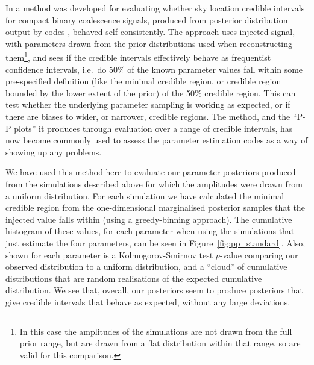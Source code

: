 In \citet{2014PhRvD..89h4060S} a method was developed for evaluating whether sky location credible intervals for compact binary coalescence \gw signals, produced
from posterior distribution output by \lalinf codes \citep{2015PhRvD..91d2003V}, behaved self-consistently. The approach uses injected signal, with parameters
drawn from the prior distributions used when reconstructing them\footnote{In this case the amplitudes of the simulations are not drawn from the full prior range,
but are drawn from a flat distribution within that range, so are valid for this comparison.}, and sees if the credible intervals effectively behave as frequentist
confidence intervals, i.e.\ do 50\% of the known parameter values fall within some pre-specified definition (like the minimal credible region, or credible
region bounded by the lower extent of the prior) of the 50\% credible region. This can test whether the underlying \lalinf parameter sampling is working as
expected, or if there are biases to wider, or narrower, credible regions. The method, and the ``P-P plots'' it produces through evaluation over a range of credible
intervals, has now become commonly used to assess the \lalinf parameter estimation codes \citep{2015PhRvD..91d2003V} as a way of showing up any problems.

We have used this method here to evaluate our parameter posteriors produced from the simulations described above for which the amplitudes were drawn from
a uniform distribution. For each simulation we have calculated the minimal credible region from the one-dimensional marginalised posterior samples that the
injected value falls within (using a greedy-binning approach). The cumulative histogram of these values, for each parameter when using the simulations that
just estimate the four \gw parameters, can be seen in Figure~\ref{fig:pp_standard}. Also, shown for each parameter is a Kolmogorov-Smirnov test $p$-value
comparing our observed distribution to a uniform distribution, and a ``cloud'' of cumulative distributions that are random realisations of the expected
cumulative distribution. We see that, overall, our posteriors seem to produce posteriors that give credible intervals that behave as expected, without any
large deviations.

